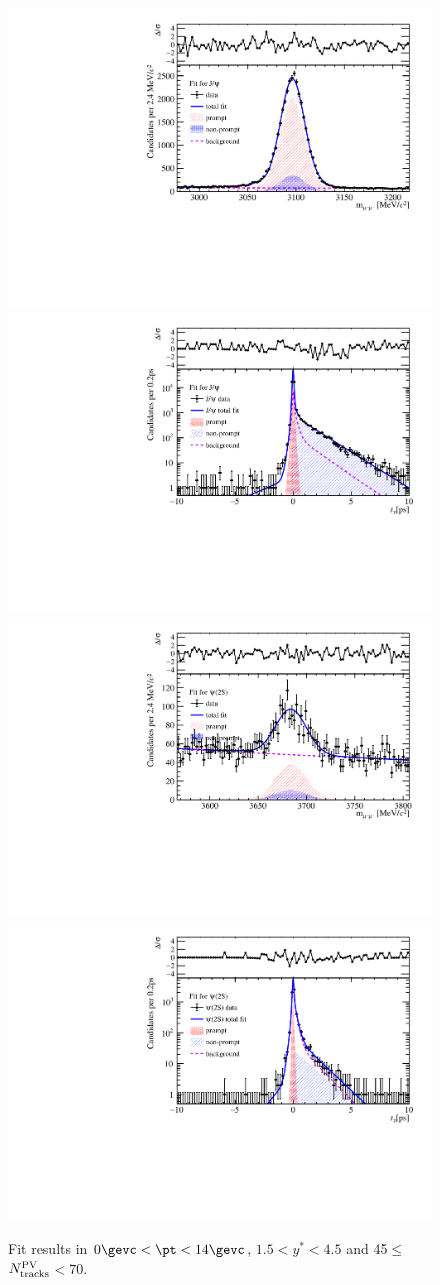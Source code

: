 \begin{figure}[H]
\begin{center}
\includegraphics[width=0.45\linewidth]{pdf/pPb/Workdir/TwoDimFit/ProjMass/Jpsi_n2y1pt1.pdf}
\includegraphics[width=0.45\linewidth]{pdf/pPb/Workdir/TwoDimFit/ProjTz/Jpsi_n2y1pt1.pdf}
\vspace*{-0.5cm}
\includegraphics[width=0.45\linewidth]{pdf/pPb/Workdir/TwoDimFit/ProjMass/Psi2S_n2y1pt1.pdf}
\includegraphics[width=0.45\linewidth]{pdf/pPb/Workdir/TwoDimFit/ProjTz/Psi2S_n2y1pt1.pdf}
\vspace*{-0.5cm}
\end{center}
\caption{Fit results in $0\gevc<\pt<14\gevc$, $1.5<y^*<4.5$ and 45$\leq$$N_{\rm tracks}^{\rm PV}$$<70$.}
\end{figure}
